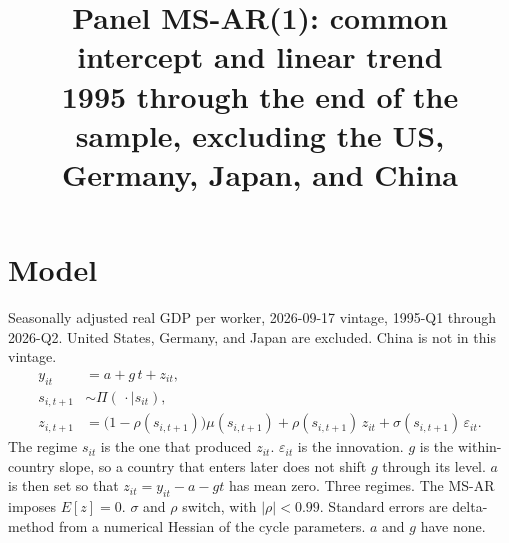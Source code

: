 \documentclass[11pt]{article}
\title{Panel MS-AR(1): common intercept and linear trend\\[0.4em]\large 1995 through the end of the sample, excluding the US, Germany, Japan, and China}
\author{}
\date{}
\begin{document}
\maketitle
\section{Model}
Seasonally adjusted real GDP per worker, 2026-09-17 vintage, 1995-Q1 through 2026-Q2. United States, Germany, and Japan are excluded. China is not in this vintage.
\begin{align}
y_{it} &= a + g\, t + z_{it}, \\
s_{i,t+1} &\sim \Pi(\,\cdot\mid s_{it}), \\
z_{i,t+1} &= \bigl(1-\rho(s_{i,t+1})\bigr)\mu(s_{i,t+1}) + \rho(s_{i,t+1})\, z_{it} + \sigma(s_{i,t+1})\,\varepsilon_{it}.
\end{align}
The regime $s_{it}$ is the one that produced $z_{it}$. $\varepsilon_{it}$ is the innovation. $g$ is the within-country slope, so a country that enters later does not shift $g$ through its level. $a$ is then set so that $z_{it}=y_{it}-a-gt$ has mean zero. Three regimes. The MS-AR imposes $E[z]=0$. $\sigma$ and $\rho$ switch, with $|\rho|<0.99$. Standard errors are delta-method from a numerical Hessian of the cycle parameters. $a$ and $g$ have none.
\clearpage
\end{document}
